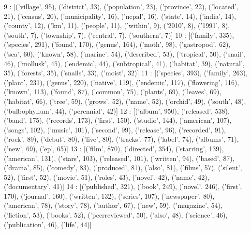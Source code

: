9 : [('village', 95), ('district', 33), ('population', 23), ('province', 22), ('located', 21), ('census', 20), ('municipality', 16), ('nepal', 16), ('state', 14), ('india', 14), ('county', 12), ('km', 11), ('people', 11), ('within', 9), ('2010', 8), ('1991', 8), ('south', 7), ('township', 7), ('central', 7), ('southern', 7)]
10 : [('family', 335), ('species', 291), ('found', 170), ('genus', 164), ('moth', 98), ('gastropod', 62), ('sea', 60), ('known', 58), ('marine', 54), ('described', 53), ('tropical', 50), ('snail', 46), ('mollusk', 45), ('endemic', 44), ('subtropical', 41), ('habitat', 39), ('natural', 35), ('forests', 35), ('snails', 33), ('moist', 32)]
11 : [('species', 393), ('family', 263), ('plant', 231), ('genus', 220), ('native', 119), ('endemic', 117), ('flowering', 116), ('known', 113), ('found', 87), ('common', 75), ('plants', 69), ('leaves', 69), ('habitat', 66), ('tree', 59), ('grows', 52), ('name', 52), ('orchid', 49), ('south', 48), ('bulbophyllum', 44), ('perennial', 42)]
12 : [('album', 950), ('released', 538), ('band', 175), ('records', 173), ('first', 150), ('studio', 144), ('american', 107), ('songs', 102), ('music', 101), ('second', 99), ('release', 96), ('recorded', 91), ('rock', 89), ('debut', 80), ('live', 80), ('tracks', 77), ('label', 74), ('albums', 71), ('new', 69), ('ep', 65)]
13 : [('film', 870), ('directed', 354), ('starring', 139), ('american', 131), ('stars', 103), ('released', 101), ('written', 94), ('based', 87), ('drama', 85), ('comedy', 83), ('produced', 81), ('also', 81), ('films', 57), ('silent', 52), ('first', 52), ('movie', 51), ('roles', 43), ('novel', 42), ('name', 42), ('documentary', 41)]
14 : [('published', 321), ('book', 249), ('novel', 246), ('first', 170), ('journal', 160), ('written', 132), ('series', 107), ('newspaper', 80), ('american', 78), ('story', 78), ('author', 67), ('new', 59), ('magazine', 54), ('fiction', 53), ('books', 52), ('peerreviewed', 50), ('also', 48), ('science', 46), ('publication', 46), ('life', 44)]
